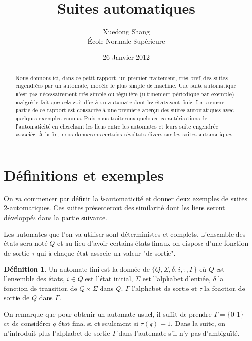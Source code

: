 \documentclass[12pt]{article}
\title{Suites automatiques}
\author{Xuedong Shang\\\'Ecole Normale Sup\'erieure}
\date{26 Janvier 2012}
\theoremstyle{plain}
\theoremstyle{definition}
\newtheorem{definition}[theoreme]{D\'efinition}
\theoremstyle{remark}
\begin{document}
\maketitle

\tableofcontents

\begin{abstract}
Nous donnons ici, dans ce petit rapport, un premier traitement, tr\`es bref, des suites engendr\'ees par un automate, mod\`ele le plus simple de machine. Une suite automatique n'est pas n\'ecessairement tr\`es simple ou r\'eguli\`ere (ultimement p\'eriodique par exemple) malgr\'e le fait que cela soit d\^ue \`a un automate dont les \'etats sont finis. La prem\`ere partie de ce rapport est consacr\'ee \`a une premi\`ere aper\c cu des suites automatiques avec quelques exemples connus. Puis nous traiterons quelques caract\'erisations de l'automaticit\'e en cherchant les liens entre les automates et leurs suite engendr\'ee associ\'ee. \`A la fin, nous donnerons certains r\'esultats divers sur les suites automatiques.
\end{abstract}

\section{D\'efinitions et exemples}
On va commencer par d\'efinir la \textit{k}-automaticit\'e et donner deux exemples de suites 2-automatiques. Ces suites pr\'esenteront des similarit\'e dont les liens seront d\'evelopp\'es dans la partie suivante.

Les automates que l'on va utiliser sont d\'eterministes et complets. L'ensemble des \'etats sera not\'e $Q$ et au lieu d'avoir certains \'etats finaux on dispose d'une fonction de sortie $\tau$ qui \`a chaque \'etat associe un valeur "de sortie".

\begin{definition}
  Un automate fini est la donn\'ee de $\{Q,\Sigma,\delta,i,\tau,\Gamma\}$ o\`u $Q$ est l'ensemble des \'etats,
  $i\in{Q}$ est l'\'etat initial, $\Sigma$ est l'alphabet d'entr\'ee, $\delta$ la fonction de transition de
  $Q\times\Sigma$ dans $Q$. $\Gamma$ l'alphabet de sortie et $\tau$ la fonction de sortie de $Q$ dans  $\Gamma$.
\end{definition}

On remarque que pour obtenir un automate usuel, il suffit de prendre $\Gamma=\{0,1\}$ et de consid\'erer $q$ \'etat final si et seulement si $\tau(q)=1$. Dans la suite, on n'introduit plus l'alphabet de sortie $\Gamma$ dans l'automate s'il n'y pas d'ambigu\"it\'e.
\end{document}
